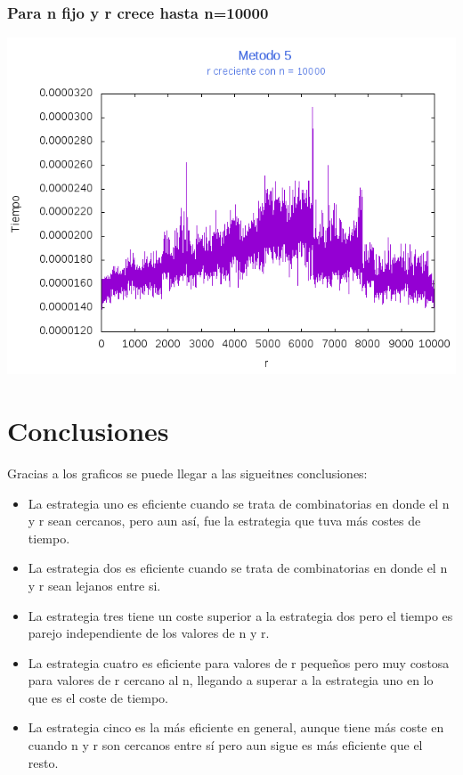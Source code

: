 \documentclass[12pt,letterpaper]{scrartcl}
\begin{document}
\subsubsection{Para n fijo y r crece hasta n=10000}
\includegraphics[scale=1]{Metodo5/plot10000m5}

\newpage
\section{Conclusiones}

Gracias a los graficos se puede llegar a las sigueitnes conclusiones:

\begin{itemize}
\item La estrategia uno es eficiente cuando se trata de combinatorias en donde el n y r sean cercanos, pero aun así, fue la estrategia que tuva más costes de tiempo.
\item La estrategia dos es eficiente cuando se trata de combinatorias en donde el n y r sean lejanos entre si.
\item La estrategia tres tiene un coste superior a la estrategia dos pero el tiempo es parejo independiente de los valores de n y r.
\item La estrategia cuatro es eficiente para valores de r pequeños pero muy costosa para valores de r cercano al n, llegando a superar a la estrategia uno en lo que es el coste de tiempo.
\item La estrategia cinco es la más eficiente en general, aunque tiene más coste en cuando n y r son cercanos entre sí pero aun sigue es más eficiente que el resto.
\end{itemize}
\end{document}
